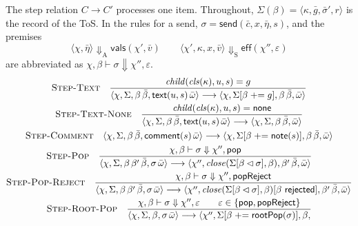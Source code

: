 \documentclass[11pt]{article}
\numberwithin{equation}{section}
\newcommand{\kw}[1]{\ensuremath{\mathsf{#1}}}
\newcommand{\rulelabel}[1]{\textsc{#1}}
\begin{document}
The step relation $C \longrightarrow C'$ processes one item.  Throughout,
$\Sigma(\beta) = \langle \kappa, \bar g, \bar\sigma', r \rangle$ is the
record of the ToS.  In the rules for a send,
$\sigma = \kw{send}(\bar c, x, \bar\eta, s)$, and the premises
\[
\langle \chi, \bar\eta \rangle \Downarrow_{\mathrm{A}} \kw{vals}(\chi', \bar v)
\qquad
\langle \chi', \kappa, x, \bar v \rangle \Downarrow_{\mathrm{S}}
  \kw{eff}(\chi'', \varepsilon)
\]
are abbreviated as $\chi, \beta \vdash \sigma \Downarrow \chi'', \varepsilon$.
\begin{gather}
\label{eq:step-text}
\rulelabel{Step-Text}\quad
\frac{\mathit{child}(\mathit{cls}(\kappa), u, s) = g}
     {\langle \chi, \Sigma, \beta\,\bar\beta, \kw{text}(u, s)\,\bar\omega \rangle
      \longrightarrow
      \langle \chi, \Sigma[\beta \mathrel{+}= g], \beta\,\bar\beta, \bar\omega \rangle}
\\
\label{eq:step-text-none}
\rulelabel{Step-Text-None}\quad
\frac{\mathit{child}(\mathit{cls}(\kappa), u, s) = \kw{none}}
     {\langle \chi, \Sigma, \beta\,\bar\beta, \kw{text}(u, s)\,\bar\omega \rangle
      \longrightarrow
      \langle \chi, \Sigma, \beta\,\bar\beta, \bar\omega \rangle}
\\
\label{eq:step-comment}
\rulelabel{Step-Comment}\quad
\langle \chi, \Sigma, \beta\,\bar\beta, \kw{comment}(s)\,\bar\omega \rangle
\longrightarrow
\langle \chi, \Sigma[\beta \mathrel{+}= \kw{note}(s)], \beta\,\bar\beta,
  \bar\omega \rangle
\\
\label{eq:step-pop}
\rulelabel{Step-Pop}\quad
\frac{\chi, \beta \vdash \sigma \Downarrow \chi'', \kw{pop}}
     {\langle \chi, \Sigma, \beta\,\beta'\,\bar\beta, \sigma\,\bar\omega \rangle
      \longrightarrow
      \langle \chi'', \mathit{close}(\Sigma[\beta \lhd \sigma], \beta),
        \beta'\,\bar\beta, \bar\omega \rangle}
\\
\label{eq:step-pop-reject}
\rulelabel{Step-Pop-Reject}\quad
\frac{\chi, \beta \vdash \sigma \Downarrow \chi'', \kw{popReject}}
     {\langle \chi, \Sigma, \beta\,\beta'\,\bar\beta, \sigma\,\bar\omega \rangle
      \longrightarrow
      \langle \chi'', \mathit{close}(\Sigma[\beta \lhd \sigma], \beta)
        [\beta\ \kw{rejected}], \beta'\,\bar\beta, \bar\omega \rangle}
\\
\label{eq:step-root-pop}
\rulelabel{Step-Root-Pop}\quad
\frac{\chi, \beta \vdash \sigma \Downarrow \chi'', \varepsilon
      \qquad \varepsilon \in \{\kw{pop}, \kw{popReject}\}}
     {\langle \chi, \Sigma, \beta, \sigma\,\bar\omega \rangle
      \longrightarrow
      \langle \chi'', \Sigma[\beta \mathrel{+}= \kw{rootPop}(\sigma)], \beta,
}
\end{gather}
\end{document}
